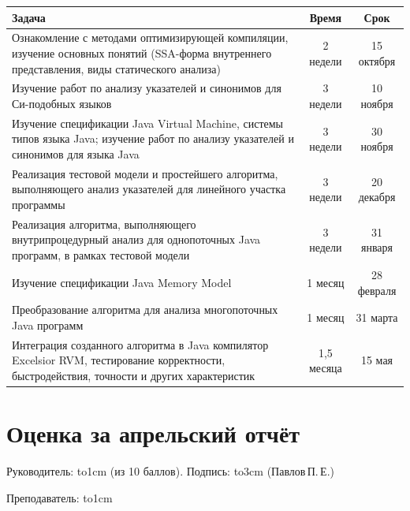 \documentclass[14pt,titlepage]{extarticle}
\newcommand{\underscore}[1]{\hbox to#1{\hrulefill}}
\let\oldsection\section
\renewcommand{\section}{\newpage\oldsection}
\begin{document}
    \begin{center}
      \begin{tabular}{|p{10.5cm}|c|c|}\hline
        \textbf{Задача}                       &\textbf{Время} & \textbf{Срок}\\
        \hline
        Ознакомление с методами оптимизирующей компиляции, изучение
        основных понятий (SSA-форма внутреннего представления,
        виды статического анализа)
                                              & 2 недели    & 15 октября \\
        \hline
        Изучение работ по анализу указателей и синонимов для Си-подобных языков
                                              & 3 недели    & 10 ноября \\
        \hline
        Изучение спецификации Java Virtual Machine, системы типов языка Java;
        изучение работ по анализу указателей и синонимов для языка Java
                                              & 3 недели    & 30 ноября \\
        \hline
        Реализация тестовой модели и простейшего алгоритма, выполняющего
        анализ указателей для линейного участка программы
                                              & 3 недели    & 20 декабря \\
        \hline
        Реализация алгоритма, выполняющего внутрипроцедурный анализ для
        однопоточных Java программ, в рамках тестовой модели
                                              & 3 недели    & 31 января \\
        \hline
        Изучение спецификации Java Memory Model
                                              & 1 месяц     & 28 февраля \\
        \hline
        Преобразование алгоритма для анализа многопоточных Java программ
                                              & 1 месяц     & 31 марта \\
        \hline
        Интеграция созданного алгоритма в Java компилятор Excelsior RVM,
        тестирование корректности, быстродействия, точности и
        других характеристик
                                              & 1,5 месяца  & 15 мая \\
        \hline
      \end{tabular}
    \end{center}



  \newpage
  \thispagestyle{empty}
  \pagestyle{empty}
  \section*{Оценка за апрельский отчёт}

    Руководитель: \underscore{1cm} (из 10 баллов).
    Подпись: \underscore{3cm} (Павлов\,П.\,Е.)

    \vspace{0.5cm}
    Преподаватель: \underscore{1cm}
\end{document}
